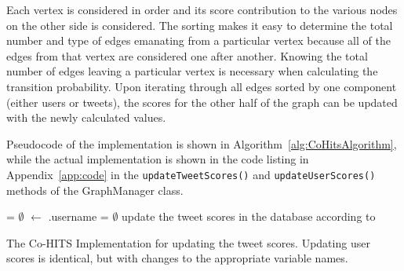 Each vertex is considered in order and its score contribution to the various nodes on the other side is considered. The sorting makes it easy to determine the total number and type of edges emanating from a particular vertex because all of the edges from that vertex are considered one after another. Knowing the total number of edges leaving a particular vertex is necessary when calculating the transition probability. Upon iterating through all edges sorted by one component (either users or tweets), the scores for the other half of the graph can be updated with the newly calculated values.

Pseudocode of the implementation is shown in Algorithm~\ref{alg:CoHitsAlgorithm}, while the actual implementation is shown in the code listing in Appendix~\ref{app:code} in the \texttt{updateTweetScores()} and \texttt{updateUserScores()} methods of the GraphManager class.

\begin{algorithm}
 \TweetScores = $\emptyset$\;
 \LastName $\leftarrow$ \FirstEdge.username\;
 \CurUserEdges = $\emptyset$\;
 update the tweet scores in the database according to \TweetScores
 \caption{The Co-HITS Implementation for updating the tweet scores. Updating user scores is identical, but with changes to the appropriate variable names.}
 \label{alg:CoHitsAlgorithm}
\end{algorithm}

